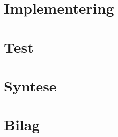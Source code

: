 \chapter{Implementering}



%
%
%
\chapter{Test}


\chapter{Syntese}

\newpage

\newpage

\begingroup
\raggedright



%
%

\endgroup

\appendix
\chapter{Bilag}



